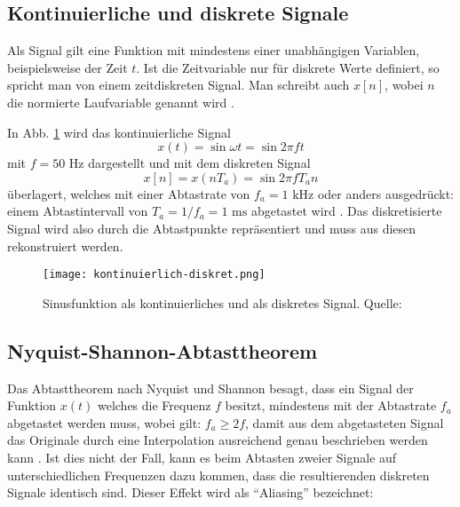 \subsection{Kontinuierliche und diskrete Signale}
Als Signal gilt eine Funktion mit mindestens einer unabhängigen Variablen, beispielsweise der Zeit \(t\). Ist die Zeitvariable nur für diskrete Werte definiert, so spricht man von einem zeitdiskreten Signal. Man schreibt auch \(x[n]\), wobei \(n\) die normierte Laufvariable genannt wird \cite[vgl. Werner, S. 24]{Werner:2017}.

In Abb. \ref{kontinuierlich_diskret} wird das kontinuierliche Signal
\[x(t) = \sin \omega t = \sin 2\pi f t\]
mit \(f = 50 \text{ Hz} \) dargestellt und mit dem diskreten Signal
\[x[n] = x(nT_a) = \sin 2\pi f T_a n\]
überlagert, welches mit einer Abtastrate von \(f_a = 1 \text{ kHz}\) oder anders ausgedrückt: einem Abtastintervall von \(T_a = 1 / f_a = 1 \text{ ms}\) abgetastet wird \cite[vgl. Heuberger, e. a., S. 11f]{Heuberger:2017}. Das diskretisierte Signal wird also durch die Abtastpunkte repräsentiert und muss aus diesen rekonstruiert werden.

\begin{figure}[ht]
	\centering
	\texttt{[image: kontinuierlich-diskret.png]}
	\caption[Sinusfunktion als kontinuierliches und als diskretes Signal]{Sinusfunktion als kontinuierliches und als diskretes Signal. \newline Quelle: \cite[Heuberger, e. a., S. 12]{Heuberger:2017}} 
	\label{kontinuierlich_diskret}
\end{figure}



\subsection{Nyquist-Shannon-Abtasttheorem}
Das Abtasttheorem nach Nyquist und Shannon besagt, dass ein Signal der Funktion \(x(t)\) welches die Frequenz \(f\) besitzt, mindestens mit der Abtastrate \(f_a\) abgetastet werden muss, wobei gilt: \(f_a \ge 2f\), damit aus dem abgetasteten Signal das Originale durch eine Interpolation ausreichend genau beschrieben werden kann \cite[vgl. Werner, S. 30]{Werner:2006}. 
Ist dies nicht der Fall, kann es beim Abtasten zweier Signale auf unterschiedlichen Frequenzen dazu kommen, dass die resultierenden diskreten Signale identisch sind. Dieser Effekt wird als \enquote{Aliasing} bezeichnet:

